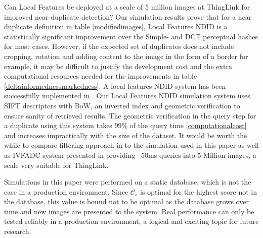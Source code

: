 \documentclass[english,12pt,a4paper,pdftex,elec,utf8, table]{aaltothesis}
\begin{document}
Can Local Features be deployed at a scale of 5 million images at ThingLink for improved near-duplicate detection? Our simulation results prove that for a near duplicate definition in table \ref{modifiedimages}, Local Features NDID is a statistically significant improvement over the Simple- and DCT perceptual hashes for most cases. However, if the expected set of duplicates does not include cropping, rotation and adding content to the image in the form of a border for example, it may be difficult to justify the development cost and the extra computational resources needed for the improvements in table \ref{deltainformednessmarkedness}. A local features NDID system has been successfully implemented in \cite{dong2012high}. Our Local Features NDID simulation system uses SIFT descriptors with BoW, an inverted index and geometric verification to ensure sanity of retrieved results. The geometric verification in the query step for a duplicate using this system takes 99\% of the query time \ref{computationalcost} and increases impractically with the size of the dataset. It would be worth the while to compare filtering approach in \cite{dong2012high} to the simulation used in this paper as well as IVFADC system presented in \cite{Jegou2010} providing ~50ms queries into 5 Million images, a scale very suitable for ThingLink.

Simulations in this paper were performed on a static database, which is not the case in a production environment. Since $\mathcal{C}_s$ is optimal for the highest score not in the database, this value is bound not to be optimal as the database grows over time and new images are presented to the system. Real performance can only be tested reliably in a production environment, a logical and exciting topic for future research.

\clearpage


{}

{}
\end{document}
